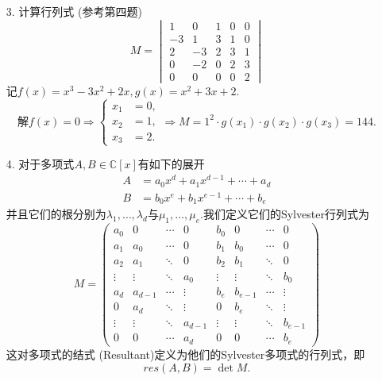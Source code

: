\documentclass{article}
\begin{document}
\begin{enumerate}
\begin{enumerate}
    \end{enumerate}
    \item [3.]计算行列式 (参考第四题)
    \[
        M=
        \begin{vmatrix}
            1  & 0  & 1 & 0 & 0\\
            -3 & 1  & 3 & 1 & 0\\
            2  & -3 & 2 & 3 & 1\\
            0  & -2 & 0 & 2 & 3\\
            0  &  0 & 0 & 0 & 2
        \end{vmatrix}
    \]
    记$f(x)=x^3-3x^2+2x,g(x)=x^2+3x+2$.
    \[
        \mbox{解}f(x)=0
        \Rightarrow
        \begin{cases}
            x_1&=0,\\
            x_2&=1,\\
            x_3&=2.
        \end{cases}        
        \Rightarrow
        M=1^2\cdot g(x_1)\cdot g(x_2)\cdot g(x_3)=144.
    \]
    \item [4.]对于多项式$A,B\in \mathbb{C}[x]$有如下的展开
    \begin{align*}
        A&=a_0 x^d +a_1 x^{d-1} +\cdots +a_d\\
        B&=b_0 x^e +b_1 x^{e-1} +\cdots +b_e
    \end{align*}
    并且它们的根分别为$\lambda_1,\ldots,\lambda_d$与$\mu_1,\ldots,\mu_e$.我们定义它们的Sylvester行列式为
    \[
        M=
        \begin{pmatrix}
            a_0    &   0    & \cdots &      0 &    b_0 &      0 & \cdots & 0\\
            a_1    & a_0    & \cdots &      0 &    b_1 &    b_0 & \cdots & 0\\
            a_2    & a_1    & \ddots &      0 &    b_2 &    b_1 & \ddots & 0\\
            \vdots & \vdots & \ddots &    a_0 & \vdots & \vdots & \ddots & b_0\\
            a_d    & a_{d-1}& \cdots & \vdots &    b_e & b_{e-1}& \cdots & \vdots\\
            0      & a_d    & \ddots & \vdots &      0 &    b_e & \ddots & \vdots\\
            \vdots & \vdots & \ddots & a_{d-1}& \vdots & \vdots & \ddots & b_{e-1}\\
            0      &   0    & \cdots &    a_d &      0 &      0 & \cdots & b_e
        \end{pmatrix}
    \]
    这对多项式的结式 (Resultant)定义为他们的Sylvester多项式的行列式，即\[res(A, B) = \det M.\]

\end{enumerate}
\end{document}
